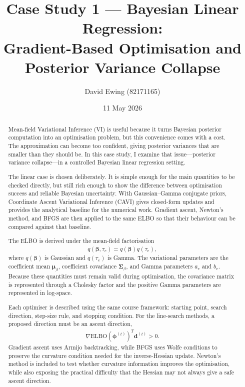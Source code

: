 \documentclass[11pt,a4paper]{article}
\title{
Case Study 1 --- Bayesian Linear Regression:\\[0.4em]
Gradient-Based Optimisation and Posterior Variance Collapse
}
\author{
  David Ewing (82171165)\\
}
\date{11 May 2026}
\newcommand{\ELBO}{\text{ELBO}}
\begin{document}
\maketitle

\begin{abstract}
\setlength{\parindent}{0pt}
\setlength{\parskip}{0.7em}

Mean-field Variational Inference (VI) is useful because it turns Bayesian posterior computation into an optimisation problem, but this convenience comes with a cost. The approximation can become too confident, giving posterior variances that are smaller than they should be. In this case study, I examine that issue---posterior variance collapse---in a controlled Bayesian linear regression setting.

The linear case is chosen deliberately. It is simple enough for the main quantities to be checked directly, but still rich enough to show the difference between optimisation success and reliable Bayesian uncertainty. With Gaussian--Gamma conjugate priors, Coordinate Ascent Variational Inference (CAVI) gives closed-form updates and provides the analytical baseline for the numerical work. Gradient ascent, Newton's method, and BFGS are then applied to the same ELBO so that their behaviour can be compared against that baseline.

The ELBO is derived under the mean-field factorisation
\begin{align*}
q(\bm{\beta},\tau_e)=q(\bm{\beta})q(\tau_e),
\end{align*}
where $q(\bm{\beta})$ is Gaussian and $q(\tau_e)$ is Gamma. The variational parameters are the coefficient mean $\bm{\mu}_\beta$, coefficient covariance $\bm{\Sigma}_\beta$, and Gamma parameters $a_e$ and $b_e$. Because these quantities must remain valid during optimisation, the covariance matrix is represented through a Cholesky factor and the positive Gamma parameters are represented in log-space.

Each optimiser is described using the same course framework: starting point, search direction, step-size rule, and stopping condition. For the line-search methods, a proposed direction must be an ascent direction,
\begin{align*}
\nabla\ELBO(\bm{\phi}^{(t)})^T\bm{d}^{(t)} > 0.
\end{align*}
Gradient ascent uses Armijo backtracking, while BFGS uses Wolfe conditions to preserve the curvature condition needed for the inverse-Hessian update. Newton's method is included to test whether curvature information improves the optimisation, while also exposing the practical difficulty that the Hessian may not always give a safe ascent direction.


\end{abstract}
\end{document}
